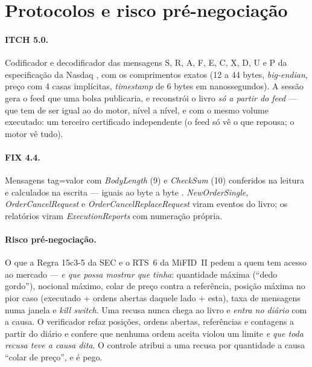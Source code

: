 \section{Protocolos e risco pré-negociação}\label{sec:fin-protocolos}

\paragraph{ITCH 5.0.} Codificador e decodificador das mensagens S, R, A, F, E, C, X, D, U e P da especificação da Nasdaq \cite{itch50}, com os comprimentos exatos (12 a 44 bytes, \textit{big-endian}, preço com 4 casas implícitas, \textit{timestamp} de 6 bytes em nanossegundos). A sessão gera o feed que uma bolsa publicaria, e  reconstrói o livro \emph{só a partir do feed} --- que tem de ser igual ao do motor, nível a nível, e com o mesmo volume executado: um terceiro certificado independente (o feed só vê o que repousa; o motor vê tudo).

\paragraph{FIX 4.4.} Mensagens tag=valor com \textit{BodyLength} (9) e \textit{CheckSum} (10) conferidos na leitura e calculados na escrita --- iguais ao  byte a byte \cite{fix44}. \textit{NewOrderSingle}, \textit{OrderCancelRequest} e \textit{OrderCancelReplaceRequest} viram eventos do livro; os relatórios viram \textit{ExecutionReports} com numeração própria.

\paragraph{Risco pré-negociação.} O que a Regra 15c3-5 da SEC \cite{sec15c35} e o RTS~6 da MiFID~II \cite{rts6} pedem a quem tem acesso ao mercado --- \emph{e que possa mostrar que tinha}: quantidade máxima (``dedo gordo''), nocional máximo, colar de preço contra a referência, posição máxima no pior caso (executado + ordens abertas daquele lado + esta), taxa de mensagens numa janela e \textit{kill switch}. Uma recusa nunca chega ao livro e \emph{entra no diário} com a causa. O verificador refaz posições, ordens abertas, referências e contagens a partir do diário e confere que nenhuma ordem aceita violou um limite \emph{e que toda recusa teve a causa dita}. O controle atribui a uma recusa por quantidade a causa ``colar de preço'', e é pego.


